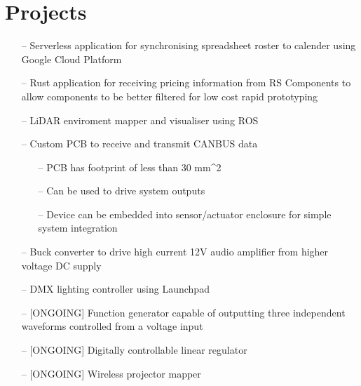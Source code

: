 \section{Projects}

\begin{itemize}[leftmargin=10pt, itemsep=0pt]
    \item[--] Serverless application for synchronising spreadsheet roster to calender
                using Google Cloud Platform

    \item[--] Rust application for receiving pricing information from RS Components
                to allow components to be better filtered for low cost rapid prototyping

    \item[--] LiDAR enviroment mapper and visualiser using ROS

    \item[--] Custom PCB to receive and transmit CANBUS data
      \begin{itemize}
        \item[--] PCB has footprint of less than 30 mm^2
        \item[--] Can be used to drive system outputs
        \item[--] Device can be embedded into sensor/actuator enclosure for simple system integration
      \end{itemize}

    \item[--] Buck converter to drive high current 12V audio amplifier from higher voltage DC supply

    \item[--] DMX lighting controller using Launchpad

    \item[--] [ONGOING] Function generator capable of outputting three independent waveforms controlled from a voltage input

    \item[--] [ONGOING] Digitally controllable linear regulator

    \item[--] [ONGOING] Wireless projector mapper
\end{itemize}
